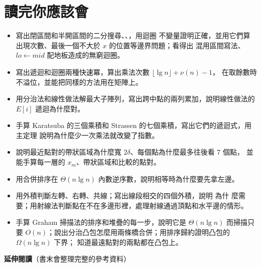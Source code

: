 \section{讀完你應該會}
\label{sec:dc-checklist}

\begin{itemize}
\item 寫出閉區間和半開區間的二分搜尋、、，用迴圈
不變量證明正確，並用它們算出現次數、最後一個不大於 $x$ 的位置等邊界問題；看得出
混用區間寫法、$\mathit{lo} \gets \mathit{mid}$ 配地板造成的無窮迴圈。
\item 寫出遞迴和迴圈兩種快速冪，算出乘法次數 $\lfloor \lg n \rfloor + \nu(n) - 1$，
在取餘數時不溢位，並能把同樣的方法用在矩陣上。
\item 用分治法和線性做法解最大子陣列，寫出跨中點的兩列累加，說明線性做法的
$E[i]$ 遞迴為什麼對。
\item 手算 Karatsuba 的三個乘積和 Strassen 的七個乘積，寫出它們的遞迴式，用主定理
說明為什麼少一次乘法就改變了指數。
\item 說明最近點對的帶狀區域為什麼寬 $2\delta$、每個點為什麼最多往後看 $7$ 個點，
並能手算每一層的 $x_m$、帶狀區域和比較的點對。
\item 用合併排序在 $\Theta(n \lg n)$ 內數逆序數，說明相等時為什麼要先拿左邊。
\item 用外積判斷左轉、右轉、共線；寫出線段相交的四個外積，說明  為什
麼需要；用射線法判斷點在不在多邊形裡，處理射線通過頂點和水平邊的情形。
\item 手算 Graham 掃描法的排序和堆疊的每一步，說明它是 $\Theta(n \lg n)$ 而掃描只要
$O(n)$；說出分治凸包怎麼用兩條橋合併；用排序歸約證明凸包的 $\Omega(n \lg n)$ 下界；
知道最遠點對的兩點都在凸包上。
\end{itemize}

\textbf{延伸閱讀}（書末會整理完整的參考資料）

